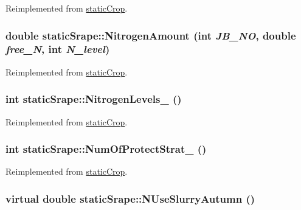 Reimplemented from \hyperlink{classstatic_crop_a9b67ef1ae531a3afb32b63a4aeb5916b}{staticCrop}.\hypertarget{classstatic_srape_ab7b04b4747f7bb609d41f76d578e2d45}{
\subsubsection[{NitrogenAmount}]{\setlength{\rightskip}{0pt plus 5cm}double staticSrape::NitrogenAmount (int {\em JB\_\-NO}, \/  double {\em free\_\-N}, \/  int {\em N\_\-level})}}
\label{classstatic_srape_ab7b04b4747f7bb609d41f76d578e2d45}


Reimplemented from \hyperlink{classstatic_crop_af3aa85321a8a75406f8a0751b71587d0}{staticCrop}.\hypertarget{classstatic_srape_ae0044ad5311c8ba1baf926ff76bb250d}{
\subsubsection[{NitrogenLevels\_\-}]{\setlength{\rightskip}{0pt plus 5cm}int staticSrape::NitrogenLevels\_\- ()}}
\label{classstatic_srape_ae0044ad5311c8ba1baf926ff76bb250d}


Reimplemented from \hyperlink{classstatic_crop_a32b69ed138beaed150efa74d18e82d8e}{staticCrop}.\hypertarget{classstatic_srape_a9e7908806107ebe3c9e2d48bfa141740}{
\subsubsection[{NumOfProtectStrat\_\-}]{\setlength{\rightskip}{0pt plus 5cm}int staticSrape::NumOfProtectStrat\_\- ()}}
\label{classstatic_srape_a9e7908806107ebe3c9e2d48bfa141740}


Reimplemented from \hyperlink{classstatic_crop_a4d3d767f569f48eb68ffa76822302467}{staticCrop}.\hypertarget{classstatic_srape_ac2055f4e715fd46e0334b739cadbe538}{
\subsubsection[{NUseSlurryAutumn}]{\setlength{\rightskip}{0pt plus 5cm}virtual double staticSrape::NUseSlurryAutumn ()}}
\label{classstatic_srape_ac2055f4e715fd46e0334b739cadbe538}


